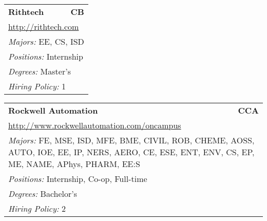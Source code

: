 \documentclass[twoside]{article}
\begin{document}
\begin{center}
\begin{multicols}{3}
\begin{FlushLeft}
\begin{minipage}{.9\columnwidth}
\end{minipage}
 
\begin{minipage}{.9\columnwidth}\begin{tabularx}{.95\columnwidth}{Xr}
                 {\Large\bf Rithtech} & {\Large\bf CB}\\
    \multicolumn{2}{p{.95\columnwidth}}{\url{http://rithtech.com}}\\
    \multicolumn{2}{p{.95\columnwidth}}{\emph{Majors:} EE, CS, ISD}\\
    \multicolumn{2}{p{.95\columnwidth}}{\emph{Positions:} Internship}\\
    \multicolumn{2}{p{.95\columnwidth}}{\emph{Degrees:} Master's}\\
    \multicolumn{2}{p{.95\columnwidth}}{\emph{Hiring Policy:} 1}\\
    \end{tabularx}
    
\end{minipage}
 
\begin{minipage}{.9\columnwidth}\begin{tabularx}{.95\columnwidth}{Xr}
                 {\Large\bf Rockwell Automation} & {\Large\bf CCA}\\
    \multicolumn{2}{p{.95\columnwidth}}{\url{http://www.rockwellautomation.com/oncampus}}\\
    \multicolumn{2}{p{.95\columnwidth}}{\emph{Majors:} FE, MSE, ISD, MFE, BME, CIVIL, ROB, CHEME, AOSS, AUTO, IOE, EE, IP, NERS, AERO, CE, ESE, ENT, ENV, CS, EP, ME, NAME, APhys, PHARM, EE:S}\\
    \multicolumn{2}{p{.95\columnwidth}}{\emph{Positions:} Internship, Co-op, Full-time}\\
    \multicolumn{2}{p{.95\columnwidth}}{\emph{Degrees:} Bachelor's}\\
    \multicolumn{2}{p{.95\columnwidth}}{\emph{Hiring Policy:} 2}\\
    \end{tabularx}
    
\end{minipage}
 

\end{FlushLeft}
\end{multicols}
\end{center}
\end{document}
